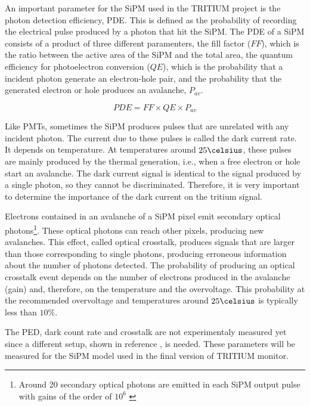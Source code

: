 An important parameter for the SiPM used in the TRITIUM project is the photon detection efficiency, PDE. This is defined as the probability of recording the electrical pulse produced by a photon that hit the SiPM. The PDE of a SiPM consists of a product of three different paramenters, the fill factor ($FF$), which is the ratio between the active area of the SiPM and the total area, the quantum efficiency for photoelectron conversion ($QE$), which is the probability that a incident photon generate an electron-hole pair, and the probability that the generated electron or hole produces an avalanche, $P_{av}$.

\begin{equation}
PDE=FF \times QE \times P_{av}
\label{PDE_SiPM}
\end{equation}

Like PMTs, sometimes the SiPM produces pulses that are unrelated with any incident photon. The current due to these pulses is called the dark current rate. It depends on temperature. At temperatures around $25\celsius$, these pulses are mainly produced by the thermal generation, i.e., when a free electron or hole start an avalanche. The dark current signal is identical to the signal produced by a single photon, so they cannot be discriminated. Therefore, it is very important to determine the importance of the dark current on the tritium signal.

Electrons contained in an avalanche of a SiPM pixel emit secondary optical photons\footnote{Around 20 secondary optical photons are emitted in each SiPM output pulse with gains of the order of $10^6$ \cite{CrosstalkProbability}}. These optical photons can reach other pixels, producing new avalanches. This effect, called optical crosstalk, produces signals that are larger than those corresponding to single photons, producing erroneous information about the number of photons detected. The probability of producing an optical crosstalk event depends on the number of electrons produced in the avalanche (gain) and, therefore, on the temperature and the overvoltage. This probability at the recommended overvoltage and temperatures around $25\celsius$ is typically less than $10\%$.

The PED, dark count rate and crosstalk are not experimentaly measured yet since a different setup, shown in reference \cite{PDEStudy}, is needed. These parameters will be measured for the SiPM model used in the final version of TRITIUM monitor.


